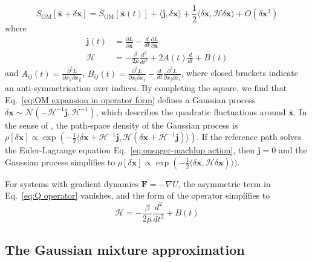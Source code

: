 \begin{equation}
S_{\text{OM}}[\bar{\mathbf{x}}+\delta\mathbf{x}]=S_{\text{OM}}[\bar{\mathbf{x}}(t)]+\langle\mathbf{j},\delta\mathbf{x}\rangle+\frac{1}{2}\langle\delta\mathbf{x},\mathcal{H}\delta\mathbf{x}\rangle+O(\delta\mathbf{x}^{3})\label{eq:OM expansion in operator form}
\end{equation}
where
\begin{align}
\mathbf{j}(t) & =\frac{\partial L}{\partial\mathbf{x}}-\frac{d}{dt}\frac{\partial L}{\partial\dot{\mathbf{x}}}\label{eq:euler-lagrange}\\
\mathcal{\mathcal{H}} & =-\frac{\beta}{2\mu}\frac{d^{2}}{dt^{2}}+2A(t)\frac{d}{dt}+B(t)\label{eq:Q operator}
\end{align}
and $A_{ij}(t)=\frac{\partial^{2}L}{\partial x_{[i}\partial\dot{x}_{j]}}$,
$B_{ij}(t)=\frac{\partial^{2}L}{\partial x_{i}\partial x_{j}}-\frac{d}{dt}\frac{\partial^{2}L}{\partial x_{j}\partial\dot{x}_{i}}$,
where closed brackets indicate an anti-symmetrisation over indices.
By completing the square, we find that Eq.~\eqref{eq:OM expansion in operator form}
defines a Gaussian process $\delta\mathbf{x}\sim\mathcal{N}(-\mathcal{H}^{-1}\mathbf{j},\mathcal{H}^{-1})$,
which describes the quadratic fluctuations around $\bar{\mathbf{x}}$.
In the sense of \citep{grossAbstractWienerSpaces1967}, the path-space
density of the Gaussian process is $\rho[\delta\mathbf{x}]\propto\exp(-\frac{1}{2}\langle\delta\mathbf{x}+\mathcal{H}^{-1}\mathbf{j},\mathcal{H}(\delta\mathbf{x}+\mathcal{H}^{-1}\mathbf{j})\rangle)$.
If the reference path solves the Euler-Lagrange equation Eq.~\eqref{eq:onsager-machlup action},
then $\mathbf{j}=0$ and the Gaussian process simplifies to $\rho[\delta\mathbf{x}]\propto\exp(-\frac{1}{2}\langle\delta\mathbf{x},\mathcal{\mathcal{\mathcal{H}}}\delta\mathbf{x})\rangle)$.

For systems with gradient dynamics $\mathbf{F}=-\nabla U$, the asymmetric
term in Eq.~\eqref{eq:Q operator} vanishes, and the form of the
operator simplifies to 
\begin{equation}
\mathcal{\mathcal{H}}=-\frac{\beta}{2\mu}\frac{d^{2}}{dt^{2}}+B(t)\label{eq:Q operator gradient}
\end{equation}

\subsection{The Gaussian mixture approximation}

